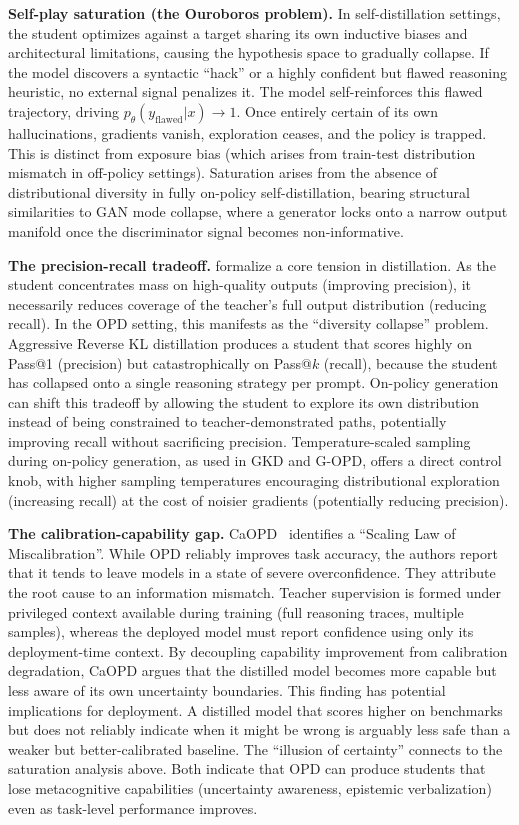 \documentclass{article} %
\newcommand{\ptheta}{p_\theta}
\begin{document}
\textbf{Self-play saturation (the Ouroboros problem).} In self-distillation settings, the student optimizes against a target sharing its own inductive biases and architectural limitations, causing the hypothesis space to gradually collapse. If the model discovers a syntactic ``hack'' or a highly confident but flawed reasoning heuristic, no external signal penalizes it. The model self-reinforces this flawed trajectory, driving $\ptheta(y_{\text{flawed}}|x) \to 1$. Once entirely certain of its own hallucinations, gradients vanish, exploration ceases, and the policy is trapped. This is distinct from exposure bias (which arises from train-test distribution mismatch in off-policy settings). Saturation arises from the absence of distributional diversity in fully on-policy self-distillation, bearing structural similarities to GAN mode collapse, where a generator locks onto a narrow output manifold once the discriminator signal becomes non-informative.

\textbf{The precision-recall tradeoff.} \citet{2505.13111} formalize a core tension in distillation. As the student concentrates mass on high-quality outputs (improving precision), it necessarily reduces coverage of the teacher's full output distribution (reducing recall). In the OPD setting, this manifests as the ``diversity collapse'' problem. Aggressive Reverse KL distillation produces a student that scores highly on Pass@1 (precision) but catastrophically on Pass@$k$ (recall), because the student has collapsed onto a single reasoning strategy per prompt. On-policy generation can shift this tradeoff by allowing the student to explore its own distribution instead of being constrained to teacher-demonstrated paths, potentially improving recall without sacrificing precision. Temperature-scaled sampling during on-policy generation, as used in GKD and G-OPD, offers a direct control knob, with higher sampling temperatures encouraging distributional exploration (increasing recall) at the cost of noisier gradients (potentially reducing precision).

\textbf{The calibration-capability gap.} CaOPD~\citep{2604.16830} identifies a ``Scaling Law of Miscalibration''. While OPD reliably improves task accuracy, the authors report that it tends to leave models in a state of severe overconfidence. They attribute the root cause to an information mismatch. Teacher supervision is formed under privileged context available during training (full reasoning traces, multiple samples), whereas the deployed model must report confidence using only its deployment-time context. By decoupling capability improvement from calibration degradation, CaOPD argues that the distilled model becomes more capable but less aware of its own uncertainty boundaries. This finding has potential implications for deployment. A distilled model that scores higher on benchmarks but does not reliably indicate when it might be wrong is arguably less safe than a weaker but better-calibrated baseline. The ``illusion of certainty'' connects to the saturation analysis above. Both indicate that OPD can produce students that lose metacognitive capabilities (uncertainty awareness, epistemic verbalization) even as task-level performance improves.
\end{document}
